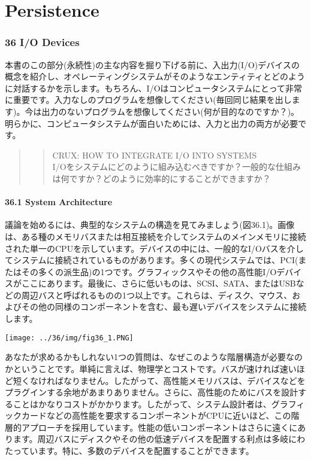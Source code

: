 \part{Persistence}

\hypertarget{io-devices}{%
\section*{36 I/O Devices}\label{io-devices}}

本書のこの部分(永続性)の主な内容を掘り下げる前に、入出力(I/O)デバイスの概念を紹介し、オペレーティングシステムがそのようなエンティティとどのように対話するかを示します。もちろん、I/Oはコンピュータシステムにとって非常に重要です。入力なしのプログラムを想像してください(毎回同じ結果を出します)。今は出力のないプログラムを想像してください(何が目的なのですか？)。明らかに、コンピュータシステムが面白いためには、入力と出力の両方が必要です。

\begin{quote}
\begin{quote}
CRUX: HOW TO INTEGRATE I/O INTO SYSTEMS\\
I/Oをシステムにどのように組み込むべきですか？一般的な仕組みは何ですか？どのように効率的にすることができますか？
\end{quote}
\end{quote}

\hypertarget{system-architecture}{%
\subsection*{36.1 System Architecture}\label{system-architecture}}

議論を始めるには、典型的なシステムの構造を見てみましょう(図36.1)。画像は、ある種のメモリバスまたは相互接続を介してシステムのメインメモリに接続された単一のCPUを示しています。デバイスの中には、一般的なI/Oバスを介してシステムに接続されているものがあります。多くの現代システムでは、PCI(またはその多くの派生品)の1つです。グラフィックスやその他の高性能I/Oデバイスがここにあります。最後に、さらに低いものは、SCSI、SATA、またはUSBなどの周辺バスと呼ばれるものの1つ以上です。これらは、ディスク、マウス、およびその他の同様のコンポーネントを含む、最も遅いデバイスをシステムに接続します。

\texttt{[image: ../36/img/fig36\_1.PNG]}

あなたが求めるかもしれない1つの質問は、なぜこのような階層構造が必要なのかということです。単純に言えば、物理学とコストです。バスが速ければ速いほど短くなければなりません。したがって、高性能メモリバスは、デバイスなどをプラグインする余地があまりありません。さらに、高性能のためにバスを設計することはかなりコストがかかります。したがって、システム設計者は、グラフィックカードなどの高性能を要求するコンポーネントがCPUに近いほど、この階層的アプローチを採用しています。性能の低いコンポーネントはさらに遠くにあります。周辺バスにディスクやその他の低速デバイスを配置する利点は多岐にわたっています。特に、多数のデバイスを配置することができます。

